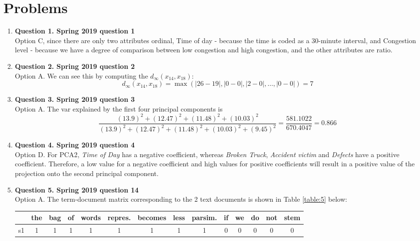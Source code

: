 \documentclass[12pt]{article}
\begin{document}
\section{Problems}
\begin{enumerate}
  \item \textbf{Question 1. Spring 2019 question 1} \\
  Option C, since there are only two attributes ordinal, Time of day - because the time is coded as a 30-minute interval, and Congestion level - because we have a degree of comparison between low congestion and high congestion, and the other attributes are ratio.
  \item \textbf{Question 2. Spring 2019 question 2} \\
  Option A. We can see this by computing the $d_{\infty}(x_{14}, x_{18})$:
  \begin{equation*}
      d_{\infty}(x_{14}, x_{18}) = \max(|26 - 19|, |0 - 0|, |2 - 0|, \dots, |0 - 0|) = 7
  \end{equation*}
  \item \textbf{Question 3. Spring 2019 question 3} \\
  Option A.
  The var explained by the first four principal components is 
  \begin{equation*}
    \frac{(13.9)^2 + (12.47)^2 + (11.48)^2 + (10.03)^2}{(13.9)^2 + (12.47)^2 + (11.48)^2 + (10.03)^2 + (9.45)^2} = \frac{581.1022}{670.4047}=0.866
  \end{equation*}
  \item \textbf{Question 4. Spring 2019 question 4} \\
  Option D.
For PCA2, \textit{Time of Day} has a negative coefficient, whereas \textit{Broken Truck}, \textit{Accident victim} and \textit{Defects} have a positive coefficient. Therefore, a low value for a negative coefficient and high values for positive coefficients will result in a positive value of the projection onto the second principal component.
  \item \textbf{Question 5. Spring 2019 question 14} \\
  Option A. The term-document matrix corresponding to the 2 text documents is shown in Table \ref{table:5} below:
  \begin{table}[H]
\begin{tabular}{|c|c|c|c|c|c|c|c|c|c|c|c|c|c|}
\hline
 & the & bag & of & words & repres. & becomes & less & parsim. & if & we & do & not & stem \\ \hline
s1 & 1 & 1 & 1 & 1 & 1 & 1 & 1 & 1 & 0 & 0 & 0 & 0 & 0 \\

\end{tabular}
\end{table}
\end{enumerate}
\end{document}

